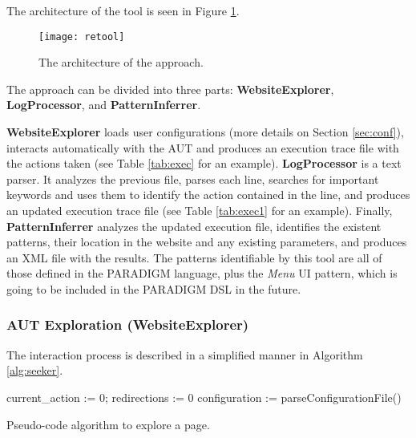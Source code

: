 The architecture of the tool is seen in Figure \ref{fig:retool}.
\begin{figure}[!htb]
\centering
\texttt{[image: retool]}
\caption{The architecture of the approach.}
\label{fig:retool}
\end{figure}

The approach can be divided into three parts: \textbf{WebsiteExplorer}, \textbf{LogProcessor}, and \textbf{PatternInferrer}.

\textbf{WebsiteExplorer} loads user configurations (more details on Section \ref{sec:conf}), interacts automatically with the AUT and produces an execution trace file with the actions taken (see Table \ref{tab:exec} for an example). \textbf{LogProcessor} is a text parser. It analyzes the previous file, parses each line, searches for important keywords and uses them to identify the action contained in the line, and produces an updated execution trace file (see Table \ref{tab:exec1} for an example). Finally, \textbf{PatternInferrer} analyzes the updated execution file, identifies the existent patterns, their location in the website and any existing parameters, and produces an XML file with the results. The patterns identifiable by this tool are all of those defined in the PARADIGM language, plus the \textit{Menu} UI pattern, which is going to be included in the PARADIGM DSL in the future. \\

\subsubsection{AUT Exploration (WebsiteExplorer)}\label{sec:inter}
The interaction process is described in a simplified manner in Algorithm \ref{alg:seeker}.

\begin{algorithm}
  
  current\_action := 0; redirections := 0\;
  configuration := parseConfigurationFile()\;
  

\caption{Pseudo-code algorithm to explore a page.}\label{alg:seeker}
\end{algorithm}

